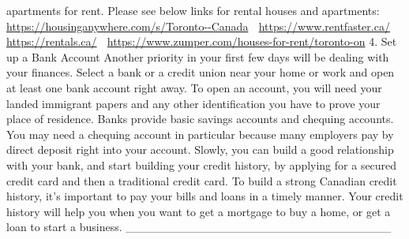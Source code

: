 \documentclass[
]{article}
\begin{document}
apartments for rent. Please see below links for rental houses and
apartments:  \url{https://housinganywhere.com/s/Toronto--Canada} 
\url{https://www.rentfaster.ca/}  \url{https://rentals.ca/} 
\url{https://www.zumper.com/houses-for-rent/toronto-on} 4. Set up a Bank
Account Another priority in your first few days will be dealing with
your finances. Select a bank or a credit union near your home or work
and open at least one bank account right away. To open an account, you
will need your landed immigrant papers and any other identification you
have to prove your place of residence. Banks provide basic savings
accounts and chequing accounts. You may need a chequing account in
particular because many employers pay by direct deposit right into your
account. Slowly, you can build a good relationship with your bank, and
start building your credit history, by applying for a secured credit
card and then a traditional credit card. To build a strong Canadian
credit history, it's important to pay your bills and loans in a timely
manner. Your credit history will help you when you want to get a
mortgage to buy a home, or get a loan to start a business.
\_\_\_\_\_\_\_\_\_\_\_\_\_\_\_\_\_\_\_\_\_\_\_\_\_\_\_\_\_\_\_\_
\end{document}
